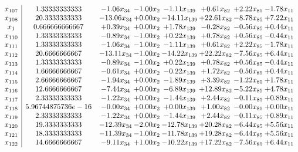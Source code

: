 \documentclass[8pt]{article}
\begin{document}
\[\begin{array}{c| c c@{\hskip 2pt} c@{\hskip 2pt} c@{\hskip 2pt} c@{\hskip 2pt} c@{\hskip 2pt} c@{\hskip 2pt} }
 x_{107}   &  1.33333333333 & -1.06 x_{34} & -1.00 x_{2} & -1.11 x_{139} & +  0.61 x_{82} & +  2.22 x_{85} & -1.78 x_{11}\\
 x_{108}   &  20.3333333333 & -13.06 x_{34} & +  0.00 x_{2} & -14.11 x_{139} & + 22.61 x_{82} & -8.78 x_{85} & +  7.22 x_{11}\\
 x_{1}   &  0.666666666667 & +  0.39 x_{34} & +  0.00 x_{2} & +  1.78 x_{139} & -0.28 x_{82} & -0.56 x_{85} & +  0.44 x_{11}\\
 x_{110}   &  1.33333333333 & -0.89 x_{34} & -1.00 x_{2} & +  0.22 x_{139} & +  0.78 x_{82} & +  0.56 x_{85} & -0.44 x_{11}\\
 x_{111}   &  1.33333333333 & -1.06 x_{34} & -1.00 x_{2} & -1.11 x_{139} & +  0.61 x_{82} & +  2.22 x_{85} & -1.78 x_{11}\\
 x_{112}   &  20.6666666667 & -13.11 x_{34} & -1.00 x_{2} & -14.22 x_{139} & + 22.22 x_{82} & -7.56 x_{85} & +  6.44 x_{11}\\
 x_{113}   &  1.33333333333 & -0.89 x_{34} & -1.00 x_{2} & +  0.22 x_{139} & +  0.78 x_{82} & +  0.56 x_{85} & -0.44 x_{11}\\
 x_{114}   &  1.66666666667 & -0.61 x_{34} & +  0.00 x_{2} & -0.22 x_{139} & +  1.72 x_{82} & -0.56 x_{85} & +  0.44 x_{11}\\
 x_{115}   &  2.66666666667 & -1.94 x_{34} & +  0.00 x_{2} & -1.89 x_{139} & +  3.39 x_{82} & -1.22 x_{85} & +  1.78 x_{11}\\
 x_{116}   &  12.6666666667 & -7.44 x_{34} & +  0.00 x_{2} & -6.89 x_{139} & + 12.89 x_{82} & -5.22 x_{85} & +  4.78 x_{11}\\
 x_{117}   &  2.33333333333 & -1.22 x_{34} & +  0.00 x_{2} & -1.44 x_{139} & +  2.44 x_{82} & -0.11 x_{85} & +  0.89 x_{11}\\
 x_{118}   &  5.96744875736e-16 & -0.00 x_{34} & +  0.00 x_{2} & +  0.00 x_{139} & +  1.00 x_{82} & -0.00 x_{85} & +  0.00 x_{11}\\
 x_{119}   &  2.33333333333 & -1.22 x_{34} & +  0.00 x_{2} & -1.44 x_{139} & +  2.44 x_{82} & -0.11 x_{85} & +  0.89 x_{11}\\
 x_{120}   &  19.3333333333 & -12.39 x_{34} & -2.00 x_{2} & -12.78 x_{139} & + 20.28 x_{82} & -6.44 x_{85} & +  5.56 x_{11}\\
 x_{121}   &  18.3333333333 & -11.39 x_{34} & -1.00 x_{2} & -11.78 x_{139} & + 19.28 x_{82} & -6.44 x_{85} & +  5.56 x_{11}\\
 x_{122}   &  14.6666666667 & -9.11 x_{34} & +  1.00 x_{2} & -10.22 x_{139} & + 17.22 x_{82} & -7.56 x_{85} & +  6.44 x_{11}\\

\end{array}\]
\end{document}
